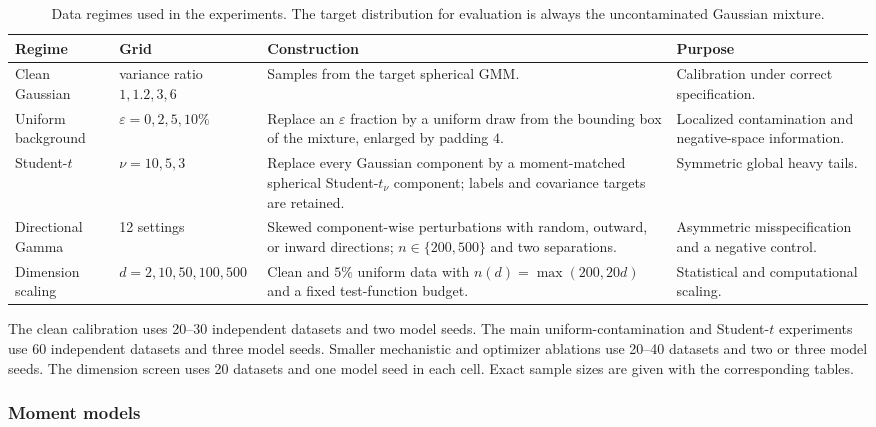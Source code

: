 \documentclass[11pt,a4paper]{article}
\begin{document}
\begin{table}[ht]
\centering
\small
\caption{Data regimes used in the experiments.  The target distribution for
evaluation is always the uncontaminated Gaussian mixture.}
\label{tab:datasets}
\begin{tabularx}{\linewidth}{@{}l l Y Y@{}}
\toprule
Regime & Grid & Construction & Purpose \\
\midrule
Clean Gaussian
  & variance ratio $1,1.2,3,6$
  & Samples from the target spherical GMM.
  & Calibration under correct specification. \\
Uniform background
  & $\varepsilon=0,2,5,10\%$
  & Replace an $\varepsilon$ fraction by a uniform draw from the bounding box
    of the mixture, enlarged by padding $4$.
  & Localized contamination and negative-space information. \\
Student-$t$
  & $\nu=10,5,3$
  & Replace every Gaussian component by a moment-matched spherical
    Student-$t_\nu$ component; labels and covariance targets are retained.
  & Symmetric global heavy tails. \\
Directional Gamma
  & 12 settings
  & Skewed component-wise perturbations with random, outward, or inward
    directions; $n\in\{200,500\}$ and two separations.
  & Asymmetric misspecification and a negative control. \\
Dimension scaling
  & $d=2,10,50,100,500$
  & Clean and $5\%$ uniform data with
    $n(d)=\max(200,20d)$ and a fixed test-function budget.
  & Statistical and computational scaling. \\
\bottomrule
\end{tabularx}
\end{table}

The clean calibration uses 20--30 independent datasets and two model seeds.
The main uniform-contamination and Student-$t$ experiments use 60 independent
datasets and three model seeds.  Smaller mechanistic and optimizer ablations
use 20--40 datasets and two or three model seeds.  The dimension screen uses
20 datasets and one model seed in each cell.  Exact sample sizes are given
with the corresponding tables.

\subsubsection{Moment models}
\end{document}
